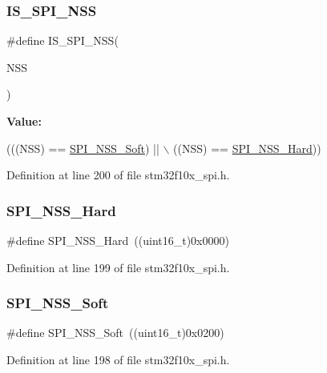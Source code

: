 \subsubsection{\texorpdfstring{I\+S\+\_\+\+S\+P\+I\+\_\+\+N\+SS}{IS\_SPI\_NSS}}
{\footnotesize\ttfamily \#define I\+S\+\_\+\+S\+P\+I\+\_\+\+N\+SS(\begin{DoxyParamCaption}\item[{}]{N\+SS }\end{DoxyParamCaption})}

{\bfseries Value\+:}
\begin{DoxyCode}
(((NSS) == \hyperlink{group___s_p_i___slave___select__management_ga105969ee7eb635414da35b41e942e383}{SPI\_NSS\_Soft}) || \(\backslash\)
                         ((NSS) == \hyperlink{group___s_p_i___slave___select__management_ga07c547459d39fb7a6e0322147a60b74a}{SPI\_NSS\_Hard}))
\end{DoxyCode}


Definition at line 200 of file stm32f10x\+\_\+spi.\+h.

\mbox{\label{group___s_p_i___slave___select__management_ga07c547459d39fb7a6e0322147a60b74a}} 
\subsubsection{\texorpdfstring{S\+P\+I\+\_\+\+N\+S\+S\+\_\+\+Hard}{SPI\_NSS\_Hard}}
{\footnotesize\ttfamily \#define S\+P\+I\+\_\+\+N\+S\+S\+\_\+\+Hard~((uint16\+\_\+t)0x0000)}



Definition at line 199 of file stm32f10x\+\_\+spi.\+h.

\mbox{\label{group___s_p_i___slave___select__management_ga105969ee7eb635414da35b41e942e383}} 
\subsubsection{\texorpdfstring{S\+P\+I\+\_\+\+N\+S\+S\+\_\+\+Soft}{SPI\_NSS\_Soft}}
{\footnotesize\ttfamily \#define S\+P\+I\+\_\+\+N\+S\+S\+\_\+\+Soft~((uint16\+\_\+t)0x0200)}



Definition at line 198 of file stm32f10x\+\_\+spi.\+h.

